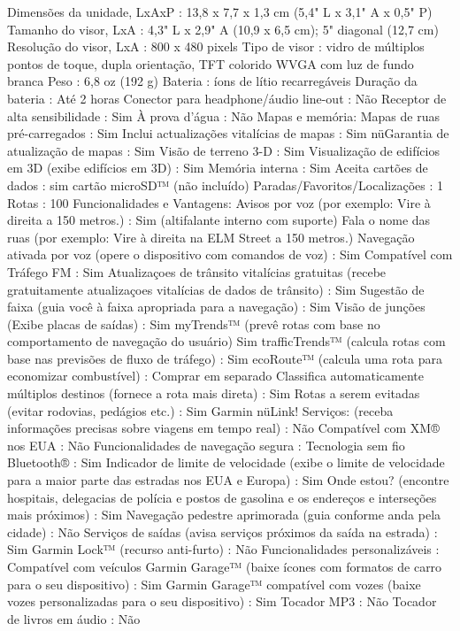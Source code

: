Dimensões da unidade, LxAxP : 13,8 x 7,7 x 1,3 cm (5,4" L x 3,1" A x 0,5" P)
Tamanho do visor, LxA : 4,3" L x 2,9" A (10,9 x 6,5 cm); 5" diagonal (12,7 cm)
Resolução do visor, LxA : 800 x 480 pixels
Tipo de visor : vidro de múltiplos pontos de toque, dupla orientação, TFT colorido WVGA com luz de fundo branca
Peso : 6,8 oz (192 g)
Bateria : íons de lítio recarregáveis
Duração da bateria : Até 2 horas
Conector para headphone/áudio line-out : Não
Receptor de alta sensibilidade : Sim
À prova d'água : Não
Mapas e memória:
Mapas de ruas pré-carregados : Sim
Inclui actualizações vitalícias de mapas : Sim
nüGarantia de atualização de mapas : Sim
Visão de terreno 3-D : Sim
Visualização de edifícios em 3D (exibe edifícios em 3D) : Sim
Memória interna : Sim
Aceita cartões de dados : sim cartão microSD™ (não incluído)
Paradas/Favoritos/Localizações : 1
Rotas : 100
Funcionalidades e Vantagens:
Avisos por voz (por exemplo: Vire à direita a 150 metros.) : Sim (altifalante interno com suporte)
Fala o nome das ruas (por exemplo: Vire à direita na ELM Street a 150 metros.)
Navegação ativada por voz (opere o dispositivo com comandos de voz) : Sim
Compatível com Tráfego FM : Sim
Atualizaçoes de trânsito vitalícias gratuitas (recebe gratuitamente atualizaçoes vitalícias de dados de trânsito) : Sim
Sugestão de faixa (guia você à faixa apropriada para a navegação) : Sim
Visão de junções (Exibe placas de saídas) : Sim
myTrends™ (prevê rotas com base no comportamento de navegação do usuário) Sim
trafficTrends™ (calcula rotas com base nas previsões de fluxo de tráfego) : Sim
ecoRoute™ (calcula uma rota para economizar combustível) : Comprar em separado
Classifica automaticamente múltiplos destinos (fornece a rota mais direta) : Sim
Rotas a serem evitadas (evitar rodovias, pedágios etc.) : Sim
Garmin nüLink! Serviços: (receba informações precisas sobre viagens em tempo real) : Não
Compatível com XM® nos EUA : Não
Funcionalidades de navegação segura :
Tecnologia sem fio Bluetooth® : Sim
Indicador de limite de velocidade (exibe o limite de velocidade para a maior parte das estradas nos EUA e Europa) : Sim
Onde estou? (encontre hospitais, delegacias de polícia e postos de gasolina e os endereços e interseções mais próximos) : Sim
Navegação pedestre aprimorada (guia conforme anda pela cidade) : Não
Serviços de saídas (avisa serviços próximos da saída na estrada) : Sim
Garmin Lock™ (recurso anti-furto) : Não
Funcionalidades personalizáveis :
Compatível com veículos Garmin Garage™ (baixe ícones com formatos de carro para o seu dispositivo) : Sim
Garmin Garage™ compatível com vozes (baixe vozes personalizadas para o seu dispositivo) : Sim
Tocador MP3 : Não
Tocador de livros em áudio : Não

